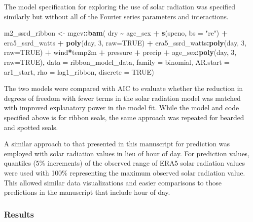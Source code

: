 \documentclass[fleqn,10pt,lineno]{wlpeerj} %
\newenvironment{Shaded}{\begin{snugshade}}{\end{snugshade}}
\newcommand{\AttributeTok}[1]{\textcolor[rgb]{0.13,0.29,0.53}{#1}}
\newcommand{\ConstantTok}[1]{\textcolor[rgb]{0.56,0.35,0.01}{#1}}
\newcommand{\DecValTok}[1]{\textcolor[rgb]{0.00,0.00,0.81}{#1}}
\newcommand{\FunctionTok}[1]{\textcolor[rgb]{0.13,0.29,0.53}{\textbf{#1}}}
\newcommand{\NormalTok}[1]{#1}
\newcommand{\OtherTok}[1]{\textcolor[rgb]{0.56,0.35,0.01}{#1}}
\newcommand{\SpecialCharTok}[1]{\textcolor[rgb]{0.81,0.36,0.00}{\textbf{#1}}}
\newcommand{\StringTok}[1]{\textcolor[rgb]{0.31,0.60,0.02}{#1}}
\begin{document}
The model specification for exploring the use of solar radiation was
specified similarly but without all of the Fourier series parameters and
interactions.

\begin{Shaded}
\begin{Highlighting}[]
\NormalTok{m2\_ssrd\_ribbon }\OtherTok{\textless{}{-}}\NormalTok{ mgcv}\SpecialCharTok{::}\FunctionTok{bam}\NormalTok{(}
\NormalTok{  dry }\SpecialCharTok{\textasciitilde{}}\NormalTok{ age\_sex }\SpecialCharTok{+} \FunctionTok{s}\NormalTok{(speno, }\AttributeTok{bs =} \StringTok{"re"}\NormalTok{) }\SpecialCharTok{+} 
\NormalTok{    era5\_ssrd\_watts }\SpecialCharTok{+}
    \FunctionTok{poly}\NormalTok{(day, }\DecValTok{3}\NormalTok{, }\AttributeTok{raw=}\ConstantTok{TRUE}\NormalTok{) }\SpecialCharTok{+} 
\NormalTok{    era5\_ssrd\_watts}\SpecialCharTok{:}\FunctionTok{poly}\NormalTok{(day, }\DecValTok{3}\NormalTok{, }\AttributeTok{raw=}\ConstantTok{TRUE}\NormalTok{) }\SpecialCharTok{+}
\NormalTok{    wind}\SpecialCharTok{*}\NormalTok{temp2m }\SpecialCharTok{+}\NormalTok{ pressure }\SpecialCharTok{+}\NormalTok{ precip }\SpecialCharTok{+} 
\NormalTok{    age\_sex}\SpecialCharTok{:}\FunctionTok{poly}\NormalTok{(day, }\DecValTok{3}\NormalTok{, }\AttributeTok{raw=}\ConstantTok{TRUE}\NormalTok{),}
  \AttributeTok{data =}\NormalTok{ ribbon\_model\_data,}
  \AttributeTok{family =}\NormalTok{ binomial,}
  \AttributeTok{AR.start =}\NormalTok{ ar1\_start,}
  \AttributeTok{rho =}\NormalTok{ lag1\_ribbon,}
  \AttributeTok{discrete =} \ConstantTok{TRUE}\NormalTok{)}
\end{Highlighting}
\end{Shaded}

The two models were compared with AIC to evaluate whether the
reduction in degrees of freedom with fewer terms in the solar radiation
model was matched with improved explanatory power in the model fit. While the
model and code specified above is for ribbon seals, the same approach was
repeated for bearded and spotted seals.

A similar approach to that presented in this manuscript for prediction was
employed with solar radiation values in lieu of hour of day. For prediction
values, quantiles (5\% increments) of the observed range of ERA5 solar radiation values were
used with 100\% representing the maximum observed solar radiation value. This
allowed similar data visualizations and easier comparisons to those
predictions in the manuscript that include hour of day.

\hypertarget{results-1}{%
\subsubsection{Results}\label{results-1}}
\end{document}
